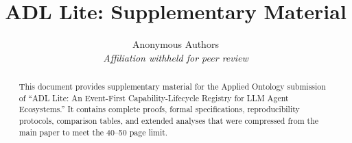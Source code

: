 \documentclass[11pt,a4paper]{article}
\title{ADL Lite: Supplementary Material}
\author{
    Anonymous Authors \\
    \textit{Affiliation withheld for peer review}
}
\date{}
\theoremstyle{definition}
\theoremstyle{remark}
\begin{document}
\maketitle

\begin{abstract}
This document provides supplementary material for the Applied Ontology submission of ``ADL Lite: An Event-First Capability-Lifecycle Registry for LLM Agent Ecosystems.'' It contains complete proofs, formal specifications, reproducibility protocols, comparison tables, and extended analyses that were compressed from the main paper to meet the 40--50 page limit.
\end{abstract}

\appendix






























\end{document}
